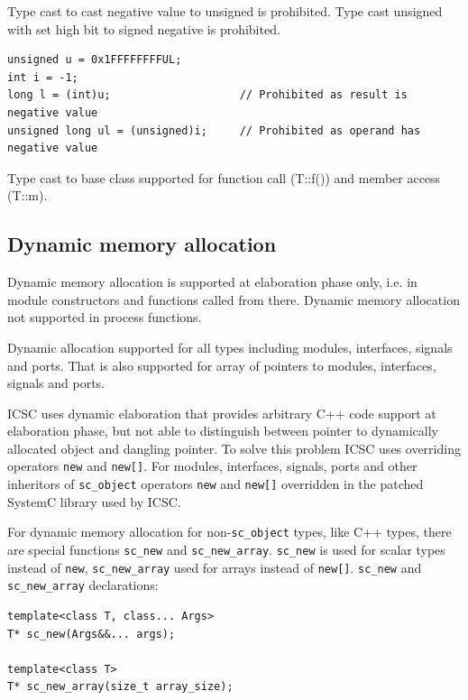 Type cast to cast negative value to unsigned is prohibited. Type cast unsigned with set high bit to signed negative is prohibited.
%
\begin{lstlisting}[style=mycpp]
unsigned u = 0x1FFFFFFFFUL;
int i = -1;
long l = (int)u;                    // Prohibited as result is negative value
unsigned long ul = (unsigned)i;     // Prohibited as operand has negative value
\end{lstlisting}

Type cast to base class supported for function call (T::f()) and member access (T::m).


\subsection{Dynamic memory allocation}

Dynamic memory allocation is supported at elaboration phase only, i.e. in module constructors and functions called from there. Dynamic memory allocation not supported in process functions.

Dynamic allocation supported for all types including modules, interfaces, signals and ports. That is also supported for array of pointers to modules, interfaces, signals and ports.

ICSC uses dynamic elaboration that provides arbitrary C++ code support at elaboration phase, but not able to distinguish between pointer to dynamically allocated object and dangling pointer. To solve this problem ICSC uses overriding operators {\tt new} and {\tt new[]}. For modules, interfaces, signals, ports and other inheritors of {\tt sc\_object} operators {\tt new} and {\tt new[]} overridden in the patched SystemC library used by ICSC. 

For dynamic memory allocation for non-{\tt sc\_object} types, like C++ types, there are special functions {\tt sc\_new} and {\tt sc\_new\_array}. {\tt sc\_new} is used for scalar types instead of {\tt new}, {\tt sc\_new\_array} used for arrays instead of {\tt new[]}. {\tt sc\_new} and {\tt sc\_new\_array} declarations:
%
\begin{lstlisting}[style=mycpp]
template<class T, class... Args>
T* sc_new(Args&&... args);
 
template<class T>
T* sc_new_array(size_t array_size);
\end{lstlisting}

